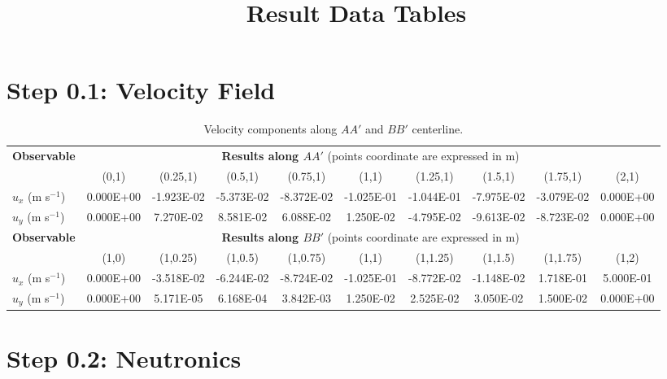 \documentclass[letterpaper,11pt]{article}
\begin{document}
%
\title{Result Data Tables}
\author{}
\date{}
%
\maketitle
%
\section*{Step 0.1: Velocity Field}

\begin{table}[htb!]
	\caption{Velocity components along $AA'$ and $BB'$ centerline.}
	\centering
	\footnotesize
	\setlength\tabcolsep{1.5pt}
	\begin{tabular}{l c c c c c c c c c}
		\toprule
		\multirow{2}{*}{\textbf{Observable}} & \multicolumn{9}{c}{\textbf{Results along $AA'$} (points coordinate are expressed in m)} \\
		& {(0,1)} & {(0.25,1)} & {(0.5,1)} & {(0.75,1)} & {(1,1)} & {(1.25,1)} & {(1.5,1)} & {(1.75,1)} & {(2,1)} \\
		\midrule
		$u_x$ (m s$^{-1}$) & 0.000E+00 & -1.923E-02 & -5.373E-02 & -8.372E-02 & -1.025E-01 & -1.044E-01 & -7.975E-02 & -3.079E-02 & 0.000E+00 \\
		$u_y$ (m s$^{-1}$) & 0.000E+00 & 7.270E-02 & 8.581E-02 & 6.088E-02 & 1.250E-02 & -4.795E-02 & -9.613E-02 & -8.723E-02 & 0.000E+00\\
		\midrule
		\midrule
		\multirow{2}{*}{\textbf{Observable}} & \multicolumn{9}{c}{\textbf{Results along $BB'$} (points coordinate are expressed in m)} \\
		& {(1,0)} & {(1,0.25)} & {(1,0.5)} & {(1,0.75)} & {(1,1)} & {(1,1.25)} & {(1,1.5)} & {(1,1.75)} & {(1,2)} \\
		\midrule
		$u_x$ (m s$^{-1}$) & 0.000E+00 & -3.518E-02 & -6.244E-02 & -8.724E-02 & -1.025E-01 & -8.772E-02 & -1.148E-02 & 1.718E-01 & 5.000E-01 \\
		$u_y$ (m s$^{-1}$) & 0.000E+00 & 5.171E-05 & 6.168E-04 & 3.842E-03 & 1.250E-02 & 2.525E-02 & 3.050E-02 & 1.500E-02 & 0.000E+00\\
		\bottomrule
	\end{tabular}
\end{table}

\section*{Step 0.2: Neutronics}
\end{document}
